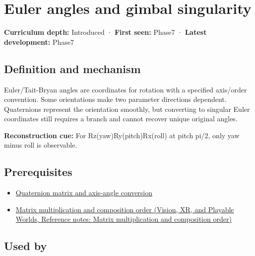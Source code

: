 \hypertarget{appendix-5f723fbd0593}{}\label{referencestart:appendix-5f723fbd0593}
\section{Euler angles and gimbal singularity}\label{appendix-5f723fbd0593-euler-angles-and-gimbal-singularity}

\textbf{Curriculum depth:} Introduced · \textbf{First seen:} Phase7 · \textbf{Latest development:} Phase7

\begin{allmightroledefinition}

\subsection{Definition and mechanism}\label{appendix-5f723fbd0593-definition-and-mechanism}

Euler/Tait-Bryan angles are coordinates for rotation with a specified axis/order convention. Some orientations make two parameter directions dependent. Quaternions represent the orientation smoothly, but converting to singular Euler coordinates still requires a branch and cannot recover unique original angles.

\end{allmightroledefinition}

\textbf{Reconstruction cue:} For Rz(yaw)Ry(pitch)Rx(roll) at pitch pi/2, only yaw minus roll is observable.

\subsection{Prerequisites}\label{appendix-5f723fbd0593-prerequisites}

\begin{itemize}
\tightlist
\item
  \hyperref[appendix-26d8da71f6c4]{Quaternion matrix and axis-angle conversion}
\item
  \href{../07-Vision-XR-and-Playable-Worlds/main.pdf\#nameddest=appendix-ab31ef447dbf}{Matrix multiplication and composition order (Vision, XR, and Playable Worlds, Reference notes: Matrix multiplication and composition order)}
\end{itemize}

\subsection{Used by}\label{appendix-5f723fbd0593-used-by}

